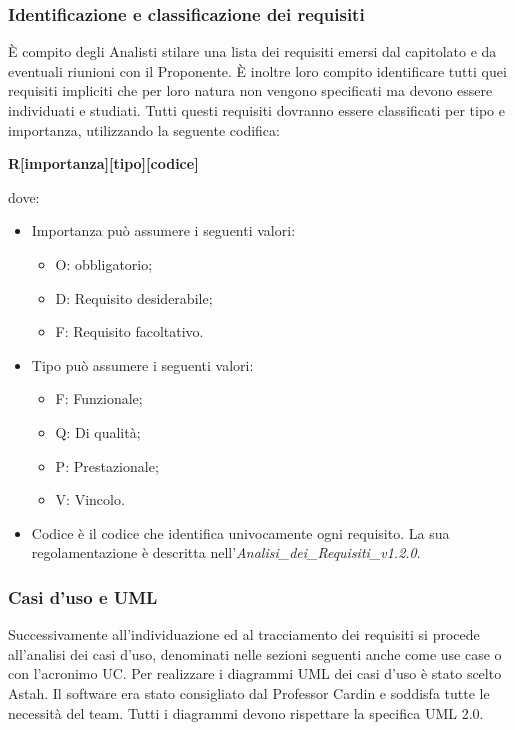 \subsubsection{Identificazione e classificazione dei requisiti}
\label{7.1}
È compito degli Analisti stilare una lista dei requisiti emersi dal capitolato e da eventuali riunioni con il Proponente. È inoltre loro compito identificare tutti quei requisiti impliciti che per loro natura non vengono specificati ma devono essere individuati e studiati. Tutti questi requisiti dovranno essere classificati per tipo e importanza, utilizzando la seguente codifica:
\begin{center}
\textbf{R[importanza][tipo][codice]}
\end{center}
dove:
\begin{itemize}
\item Importanza può assumere i seguenti valori:
\begin{itemize}
\item O:  obbligatorio;
\item D: Requisito desiderabile;
\item F: Requisito facoltativo.
\end{itemize}
\item Tipo può assumere i seguenti valori:
\begin{itemize}
\item F: Funzionale;
\item Q: Di qualità;
\item P: Prestazionale;
\item V: Vincolo.
\end{itemize}
\item Codice è il codice che identifica univocamente ogni requisito. La sua regolamentazione è descritta nell'\emph{Analisi\_dei\_Requisiti\_v1.2.0}.
\end{itemize}

\subsubsection{Casi d’uso e UML}
\label{7.2}
Successivamente all'individuazione ed al tracciamento dei requisiti si procede all'analisi dei casi d'uso, denominati nelle sezioni seguenti anche come use case o con l'acronimo UC.
Per realizzare i diagrammi UML dei casi d'uso è stato scelto Astah. Il software era stato consigliato dal Professor Cardin e soddisfa tutte le necessità del team.
Tutti i diagrammi devono rispettare la specifica UML 2.0.

